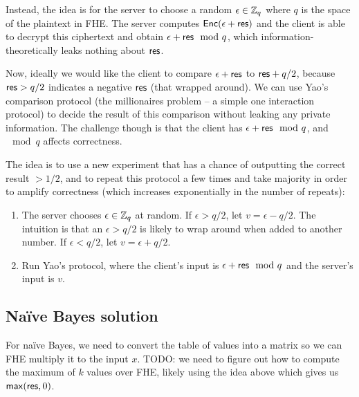 \documentclass[11pt]{article}
\begin{document}
Instead, the idea is for the server to choose a random $\epsilon \in {\mathbb Z}_q$ where $q$ is the space of the plaintext in FHE. The server computes $\mathsf{Enc}(\epsilon + \mathsf{res})$ and the client is able to decrypt this ciphertext and obtain $\epsilon + \mathsf{res} \mod q$, which information-theoretically leaks nothing about $\mathsf{res}$. 

Now, ideally we would like the client to compare $\epsilon + \mathsf{res}$ to $\mathsf{res} + q/2$, because $\mathsf{res} > q/2$ indicates a negative $\mathsf{res}$ (that wrapped around). We can use Yao's comparison protocol (the millionaires problem -- a simple one interaction protocol) to decide the result of this comparison without leaking any private information. The challenge though is that the client has $\epsilon + \mathsf{res} \mod q$, and $\mod q$ affects correctness.

The idea is to use a new experiment that has a chance of outputting the correct result $>1/2$, and to repeat this protocol a few times and take majority in order to amplify correctness (which increases exponentially in the number of repeats):

\newcommand{\eps}{\epsilon}

\begin{enumerate}
\item The server chooses $\epsilon \in {\mathbb Z}_q$ at random. If $\epsilon > q/2$,  let $v = \eps - q/2$. The intuition is that an $\eps > q/2$ is likely to wrap around when added to another number. If $\eps < q/2$, let $v = \eps + q/2$. 
\item Run Yao's protocol, where the client's input is $\eps + \res \mod q$ and the server's input is $v$. 
\end{enumerate}




 
\subsection{Na\"ive Bayes solution}

For na\"ive Bayes, we need to convert the table of values into a matrix so we can FHE multiply it to the input $x$. TODO: we need to figure out how to compute the maximum of $k$ values over FHE, likely using the idea above which gives us $\mathsf{max}(\mathsf{res}, 0)$. 
\end{document}
